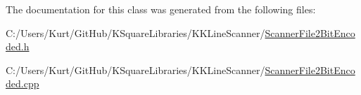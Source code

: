 The documentation for this class was generated from the following files\+:\begin{DoxyCompactItemize}
\item 
C\+:/\+Users/\+Kurt/\+Git\+Hub/\+K\+Square\+Libraries/\+K\+K\+Line\+Scanner/\hyperlink{_scanner_file2_bit_encoded_8h}{Scanner\+File2\+Bit\+Encoded.\+h}\item 
C\+:/\+Users/\+Kurt/\+Git\+Hub/\+K\+Square\+Libraries/\+K\+K\+Line\+Scanner/\hyperlink{_scanner_file2_bit_encoded_8cpp}{Scanner\+File2\+Bit\+Encoded.\+cpp}\end{DoxyCompactItemize}

